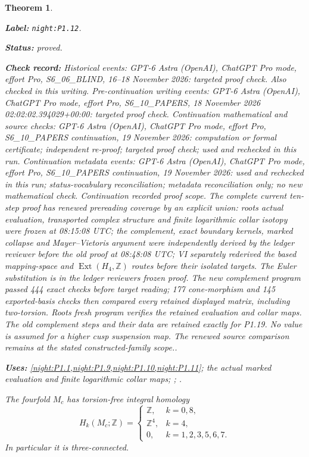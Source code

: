 \documentclass[11pt,a4paper]{article}
\newtheorem{theorem}{Theorem}[section]
\theoremstyle{definition}
\newcommand{\StatementRecord}[4]{\par\smallskip\begingroup\upshape\raggedright\noindent\textbf{Label:} \nolinkurl{#1}.\par\noindent\textbf{Status:} #2.\par\noindent\textbf{Check record:} #3.\par\noindent\textbf{Uses:} #4.\par\endgroup\smallskip}
\begin{document}
\begin{theorem}\label{night:P1.12}
\StatementRecord{night:P1.12}{proved}{Historical events: GPT-6 Astra (OpenAI), ChatGPT Pro mode, effort Pro, S6\_06\_BLIND, 16--18 November 2026: targeted proof check. Also checked in this writing. Pre-continuation writing events: GPT-6 Astra (OpenAI), ChatGPT Pro mode, effort Pro, S6\_10\_PAPERS, 18 November 2026 02:02:02.394029+00:00: targeted proof check. Continuation mathematical and source checks: GPT-6 Astra (OpenAI), ChatGPT Pro mode, effort Pro, S6\_10\_PAPERS continuation, 19 November 2026: computation or formal certificate; independent re-proof; targeted proof check; used and rechecked in this run. Continuation metadata events: GPT-6 Astra (OpenAI), ChatGPT Pro mode, effort Pro, S6\_10\_PAPERS continuation, 19 November 2026: used and rechecked in this run; status-vocabulary reconciliation; metadata reconciliation only; no new mathematical check. \emph{Continuation recorded proof scope.} The complete current ten-step proof has renewed prereading coverage by an explicit union: root\textquotesingle s actual evaluation, transported complex structure and finite logarithmic collar isotopy were frozen at 08:15:08 UTC; the complement, exact boundary kernels, marked collapse and Mayer--Vietoris argument were independently derived by the ledger reviewer before the old proof at 08:48:08 UTC; VI separately rederived the based mapping-space and $\operatorname{Ext}(H_4,\mathbb Z)$ routes before their isolated targets. The Euler substitution is in the ledger reviewer\textquotesingle s frozen proof. The new complement program passed 444 exact checks before target reading; 177 cone-morphism and 145 exported-basis checks then compared every retained displayed matrix, including two-torsion. Root\textquotesingle s fresh program verifies the retained evaluation and collar maps. The old complement steps and their data are retained exactly for P1.19. No value is assumed for a higher cusp suspension map. The renewed source comparison remains at the stated constructed-family scope.}{\cref{night:P1.1,night:P1.9,night:P1.10,night:P1.11}; the actual marked evaluation and finite logarithmic collar maps; \cite[Theorem 4.1.1 and Lemmas 4.1.2--4.1.3, pp.~480--482]{ffAchingerOgus20}; \cite[Theorem 3.2, p.~195; Theorem 3.30, p.~241; Theorem 4.32, p.~366]{Hatcher2002}}
The fourfold $M_c$ has torsion-free integral homology
\[
H_k(M_c;\mathbb Z)=
\begin{cases}
\mathbb Z,&k=0,8,\\
\mathbb Z^4,&k=4,\\
0,&k=1,2,3,5,6,7.
\end{cases}
\]
In particular it is three-connected.
\end{theorem}
\end{document}
